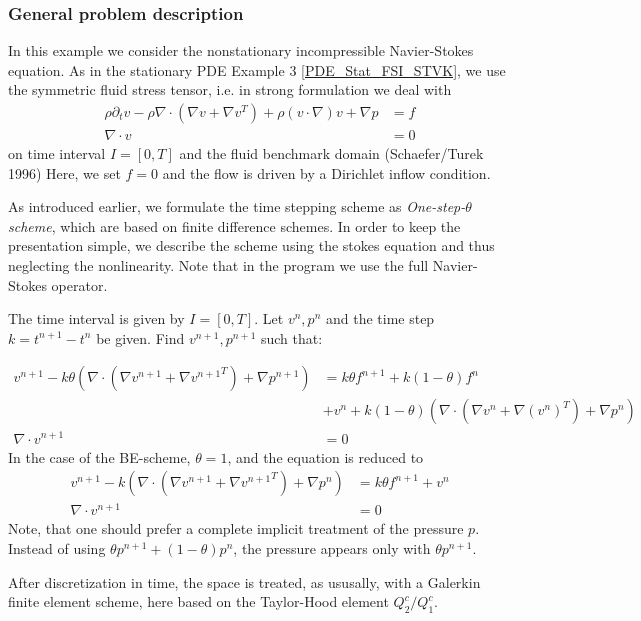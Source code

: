 \subsubsection{General problem description}
In this example we consider the nonstationary incompressible Navier-Stokes equation. As in the stationary PDE Example 3 \ref{PDE_Stat_FSI_STVK},
we use the symmetric fluid stress tensor, i.e. 
in strong formulation we deal with 
\begin{align*}
\rho \partial_t v - \rho \nabla\cdot (\nabla v + \nabla v^{T}) + \rho (v\cdot\nabla)v  +\nabla p &= f \\
\nabla\cdot v &= 0 
\end{align*}
on time interval $I=[0,T]$ and the fluid benchmark domain (Schaefer/Turek 1996) 
Here, we set $f=0$ and the flow is driven by a Dirichlet inflow condition.


As introduced earlier, we formulate the time stepping scheme as \textit{One-step-$\theta$ scheme},
which are based on finite difference schemes. In order to keep the presentation simple, we describe the scheme using the stokes equation and thus neglecting the nonlinearity. Note that in the program we use the full Navier-Stokes operator.

The time interval is given by $I=[0,T]$. Let $v^n,p^n$ and the time
step $k=t^{n+1}-t^n$ be given. Find $v^{n+1}, p^{n+1}$ such that:

\begin{align*}
v^{n+1} - k\theta \left(\nabla\cdot (\nabla v^{n+1} + \nabla {v^{n+1}}^T) + \nabla p^{n+1}\right) &=
k\theta f^{n+1} + k(1-\theta)f^{n}\\
&+  v^n + k(1-\theta) \left(\nabla\cdot (\nabla v^n + \nabla (v^n)^{T}) 
+ \nabla p^n\right) \\
\nabla \cdot v^{n+1} &= 0 
\end{align*}
In the case of the BE-scheme, $\theta = 1$, and the equation is reduced to
\begin{align*}
v^{n+1} - k (\nabla\cdot (\nabla v^{n+1} + \nabla {v^{n+1}}^{T}) + \nabla p^n) &=
k\theta f^{n+1} +  v^n  \\
\nabla \cdot v^{n+1} &= 0
\end{align*}
Note, that one should prefer a complete implicit treatment of the
pressure $p$. Instead of using $\theta p^{n+1} + (1-\theta)p^n$, the pressure
appears only with $\theta p^{n+1}$.

After discretization in time, the space is treated, as ususally, with 
a Galerkin finite element scheme, here based on the Taylor-Hood element 
$Q_2^c / Q_1^c$.

